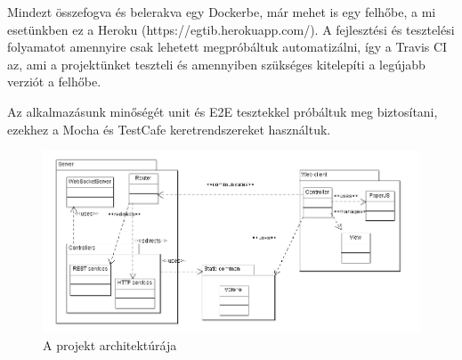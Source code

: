 Mindezt összefogva és belerakva egy Dockerbe\cite{soft:docker}, már mehet is egy felhőbe, a mi esetünkben ez a Heroku (https://egtib.herokuapp.com/). A fejlesztési és tesztelési folyamatot amennyire csak lehetett megpróbáltuk automatizálni, így a Travis CI\cite{soft:travis} az, ami a projektünket teszteli és amennyiben szükséges kitelepíti a legújabb verziót a felhőbe.

Az alkalmazásunk minőségét unit és E2E tesztekkel próbáltuk meg biztosítani, ezekhez a Mocha\cite{soft:mocha} és TestCafe\cite{soft:testcafe} keretrendszereket használtuk.

\begin{figure}[ht!]
	\centering
	\includegraphics[width=\linewidth]{images/Architecture}
	\caption{A projekt architektúrája\label{fig:Architecture}}
\end{figure}
